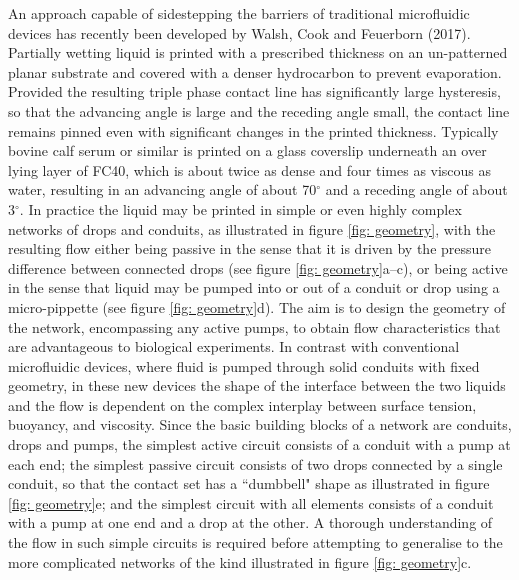 \documentclass{jfm}
\begin{document}
An approach capable of sidestepping the barriers of traditional microfluidic devices has recently been developed by Walsh,  Cook  and   Feuerborn (2017).
Partially wetting liquid is printed with a prescribed thickness on an un-patterned planar substrate and covered with a denser hydrocarbon to prevent evaporation. Provided the resulting triple phase contact line has significantly large hysteresis, so that the advancing angle is large and the receding angle small, the contact line remains pinned even with significant changes in the printed thickness.
Typically bovine calf serum or similar is printed on a glass coverslip underneath an over lying layer of FC40, which is about twice as dense and four times as viscous as water, resulting in an advancing angle of about 70$^\circ$ and a receding angle of about 3$^\circ$. 
In practice the liquid may be printed in simple or even highly complex networks of drops and conduits, as illustrated in figure \ref{fig: geometry}, with the resulting flow either being passive in the sense that it is driven by the pressure difference between connected drops (see figure \ref{fig: geometry}a--c), or being active in the sense that liquid may be pumped into or out of a conduit or drop using a micro-pippette (see figure \ref{fig: geometry}d). 
The aim is to design the geometry of the network, encompassing any active pumps, to obtain flow characteristics that are advantageous to biological experiments. In contrast with conventional microfluidic devices, where fluid is pumped through solid conduits  with fixed geometry, in these new devices the shape of the interface between the two liquids and the flow is dependent on the complex interplay between surface tension, buoyancy, and viscosity. 
Since the basic building blocks of a network are conduits, drops and pumps, the simplest active circuit consists of a conduit with a pump at each end; the simplest passive circuit consists of two drops connected by a single conduit, so that the contact set has a ``dumbbell" shape as illustrated in figure \ref{fig: geometry}e; and the simplest circuit with all elements consists of a conduit with a pump at one end and a drop at the other. 
A thorough understanding of the flow in such simple circuits is required before attempting to generalise to the more complicated networks of the kind illustrated in figure \ref{fig: geometry}c.
\end{document}
